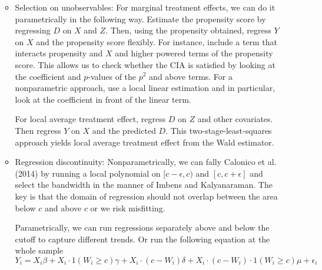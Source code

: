 \documentclass[12pt]{article}
\theoremstyle{definition}
\theoremstyle{property}
\theoremstyle{assumption}
\theoremstyle{example}
\theoremstyle{comment}
\begin{document}
\begin{itemize}
\begin{itemize}
\[\]
\item Selection on unobservables: For marginal treatment effects, we can do it parametrically in the following way. Estimate the propensity score by regressing $D$ on $X$ and $Z$. Then, using the propensity obtained, regress $Y$ on $X$ and the propensity score flexibly. For instance, include a term that interacts propensity and $X$ and higher powered terms of the propensity score. This allows us to check whether the CIA is satisfied by looking at the coefficient and $p$-values of the $p^2$ and above terms. For a nonparametric approach, use a local linear estimation and in particular, look at the coefficient in front of the linear term. \par
For local average treatment effect, regress $D$ on $Z$ and other covariates. Then regress $Y$ on $X$ and the predicted $D$. This two-stage-least-squares approach yields local average treatment effect from the Wald estimator. 
\item Regression discontinuity: Nonparametrically, we can fally Calonico et al. (2014) by running a local polynomial on $[c-\epsilon,c
)$ and $[c,c+\epsilon]$ and select the bandwidth in the manner of Imbens and Kalyanaraman. The key is that the domain of regression should not overlap between the area below $c$ and above $c$ or we risk misfitting. \par
Parametrically, we can run regressions separately above and below the cutoff to capture different trends. Or run the following equation at the whole sample
\small{\[
Y_i=X_i\beta + X_i\cdot 1(W_i\geq c)\gamma+X_i\cdot (c-W_i)\delta+ X_i\cdot (c-W_i)\cdot 1(W_i\geq c)\mu+\epsilon_i
\]}\normalsize
\end{itemize}
\end{itemize}
\end{document}
